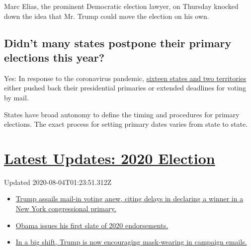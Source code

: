 Marc Elias, the prominent Democratic election lawyer, on Thursday
knocked down the idea that Mr. Trump could move the election on his own.

\hypertarget{didnt-many-states-postpone-their-primary-elections-this-year}{%
\subsection{Didn't many states postpone their primary elections this
year?}\label{didnt-many-states-postpone-their-primary-elections-this-year}}

Yes: In response to the coronavirus pandemic,
\href{https://www.nytimes.com/article/2020-campaign-primary-calendar-coronavirus.html}{sixteen
states and two territories} either pushed back their presidential
primaries or extended deadlines for voting by mail.

States have broad autonomy to define the timing and procedures for
primary elections. The exact process for setting primary dates varies
from state to state.

\hypertarget{latest-updates-2020-election}{%
\section{\texorpdfstring{\href{https://www.nytimes.com/2020/08/03/us/elections/biden-vs-trump.html?action=click\&pgtype=Article\&state=default\&region=MAIN_CONTENT_1\&context=storylines_live_updates}{Latest
Updates: 2020
Election}}{Latest Updates: 2020 Election}}\label{latest-updates-2020-election}}

Updated 2020-08-04T01:23:51.312Z

\begin{itemize}
\tightlist
\item
  \href{https://www.nytimes.com/2020/08/03/us/elections/biden-vs-trump.html?action=click\&pgtype=Article\&state=default\&region=MAIN_CONTENT_1\&context=storylines_live_updates\#link-6494b448}{Trump
  assails mail-in voting anew, citing delays in declaring a winner in a
  New York congressional primary.}
\item
  \href{https://www.nytimes.com/2020/08/03/us/elections/biden-vs-trump.html?action=click\&pgtype=Article\&state=default\&region=MAIN_CONTENT_1\&context=storylines_live_updates\#link-3de249e6}{Obama
  issues his first slate of 2020 endorsements.}
\item
  \href{https://www.nytimes.com/2020/08/03/us/elections/biden-vs-trump.html?action=click\&pgtype=Article\&state=default\&region=MAIN_CONTENT_1\&context=storylines_live_updates\#link-54e34d20}{In
  a big shift, Trump is now encouraging mask-wearing in campaign
  emails.}
\end{itemize}

